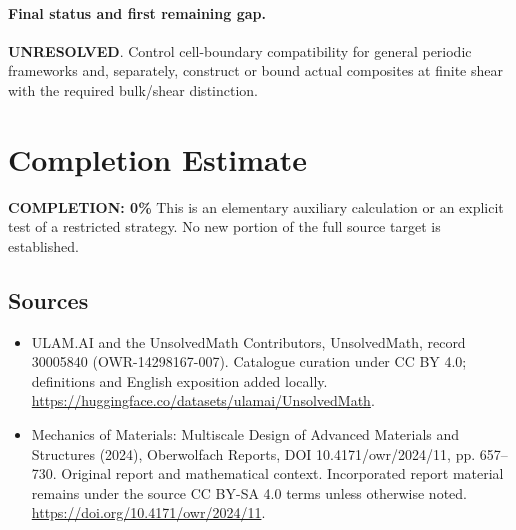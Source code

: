 \documentclass[11pt]{article}
\begin{document}
\paragraph{Final status and first remaining gap.}
\textbf{UNRESOLVED}. Control cell-boundary compatibility for general periodic frameworks and, separately, construct or bound actual composites at finite shear with the required bulk/shear distinction.

\section{Completion Estimate}
\noindent\textbf{COMPLETION: 0\%}
This is an elementary auxiliary calculation or an explicit test of a restricted strategy. No new portion of the full source target is established.

\subsection{Sources}
\begin{itemize}
\item[\hypertarget{source:30005840:1}{S1}] ULAM.AI and the UnsolvedMath Contributors, UnsolvedMath, record 30005840 (OWR-14298167-007). Catalogue curation under CC BY 4.0; definitions and English exposition added locally.
\url{https://huggingface.co/datasets/ulamai/UnsolvedMath}.
\item[\hypertarget{source:30005840:2}{S2}] Mechanics of Materials: Multiscale Design of Advanced Materials and Structures (2024), Oberwolfach Reports, DOI 10.4171/owr/2024/11, pp. 657--730. Original report and mathematical context. Incorporated report material remains under the source CC BY-SA 4.0 terms unless otherwise noted.
\url{https://doi.org/10.4171/owr/2024/11}.
\end{itemize}
\label{end:30005840}
\end{document}
